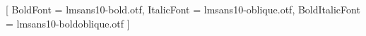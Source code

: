 \usepackage{xcolor}
\usepackage{hyperref}

\newif\ifxelatexluatex
\ifx\numexpr\undefined
  \xelatexluatexfalse
\else
  \ifx\directlua\undefined
    \ifx\XeTeXversion\undefined
      \xelatexluatexfalse
    \else
      \xelatexluatextrue
    \fi
  \else
    \xelatexluatextrue
  \fi
\fi

\ifxelatexluatex
  \setmainfont{lmsans10-regular.otf}[
    BoldFont = lmsans10-bold.otf,
    ItalicFont = lmsans10-oblique.otf,
    BoldItalicFont = lmsans10-boldoblique.otf
  ]
\else
  \usepackage[scaled=0.92]{helvet}
  \renewcommand{\familydefault}{\sfdefault}
\fi


\setlength{\parindent}{0pt}
\setlength{\parskip}{\cvParSkip}

\let\originalsection\section
\renewcommand{\section}[1]{%
  \begin{center}
    {\Huge\bfseries\color{primary}#1}
  \end{center}
  \vspace{\cvTitlePostSkip}
}

\let\originalsubsection\subsection
\renewcommand{\subsection}[1]{%
  \vspace{\cvSectionPreSkip}%
  \originalsubsection*{%
    \color{primary}#1%
  }%
  \vspace{\cvSectionRuleSkip}%
  {\color{accent}\rule{\linewidth}{0.5pt}}%
  \vspace{\cvSectionPostSkip}%
}

